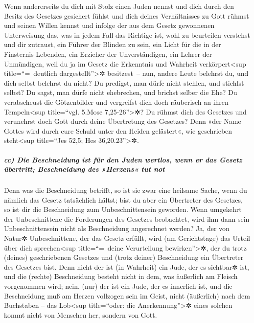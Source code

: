  Wenn andererseits du dich mit Stolz einen Juden nennst
und dich durch den Besitz des Gesetzes gesichert fühlst und dich deines
Verhältnisses zu Gott rühmst  und seinen Willen kennst
und infolge der aus dem Gesetz gewonnenen Unterweisung das, was in jedem
Fall das Richtige ist, wohl zu beurteilen verstehst  und
dir zutraust, ein Führer der Blinden zu sein, ein Licht für die in der
Finsternis Lebenden,  ein Erzieher der Unverständigen,
ein Lehrer der Unmündigen, weil du ja im Gesetz die Erkenntnis und
Wahrheit verkörpert\textless sup title=``=~deutlich
dargestellt''\textgreater✲ besitzest~--  nun, andere
Leute belehrst du, und dich selbst belehrst du nicht? Du predigst, man
dürfe nicht stehlen, und stiehlst selbst?  Du sagst, man
dürfe nicht ehebrechen, und brichst selber die Ehe? Du verabscheust die
Götzenbilder und vergreifst dich doch räuberisch an ihren
Tempeln\textless sup title=``vgl. 5.Mose 7,25-26''\textgreater✲?
 Du rühmst dich des Gesetzes und verunehrst doch Gott
durch deine Übertretung des Gesetzes?  Denn »der Name
Gottes wird durch eure Schuld unter den Heiden gelästert«, wie
geschrieben steht\textless sup title=``Jes 52,5; Hes
36,20.23''\textgreater✲.

\hypertarget{cc-die-beschneidung-ist-fuxfcr-den-juden-wertlos-wenn-er-das-gesetz-uxfcbertritt-beschneidung-des-herzens-tut-not}{%
\subparagraph{cc) Die Beschneidung ist für den Juden wertlos, wenn er
das Gesetz übertritt; Beschneidung des »Herzens« tut
not}\label{cc-die-beschneidung-ist-fuxfcr-den-juden-wertlos-wenn-er-das-gesetz-uxfcbertritt-beschneidung-des-herzens-tut-not}}

 Denn was die Beschneidung betrifft, so ist sie zwar eine
heilsame Sache, wenn du nämlich das Gesetz tatsächlich hältst; bist du
aber ein Übertreter des Gesetzes, so ist dir die Beschneidung zum
Unbeschnittensein geworden.  Wenn umgekehrt der
Unbeschnittene die Forderungen des Gesetzes beobachtet, wird ihm dann
sein Unbeschnittensein nicht als Beschneidung angerechnet werden?
 Ja, der von Natur✲ Unbeschnittene, der das Gesetz
erfüllt, wird (am Gerichtstage) das Urteil über dich
sprechen\textless sup title=``=~deine Verurteilung
bewirken''\textgreater✲, der du trotz (deines) geschriebenen Gesetzes
und (trotz deiner) Beschneidung ein Übertreter des Gesetzes bist.
 Denn nicht der ist (in Wahrheit) ein Jude, der es
sichtbar✲ ist, und die (rechte) Beschneidung besteht nicht in dem, was
äußerlich am Fleisch vorgenommen wird;  nein, (nur) der
ist ein Jude, der es innerlich ist, und die Beschneidung muß am Herzen
vollzogen sein im Geist, nicht (äußerlich) nach dem Buchstaben -- das
Lob\textless sup title=``oder: die Anerkennung''\textgreater✲ eines
solchen kommt nicht von Menschen her, sondern von Gott.

